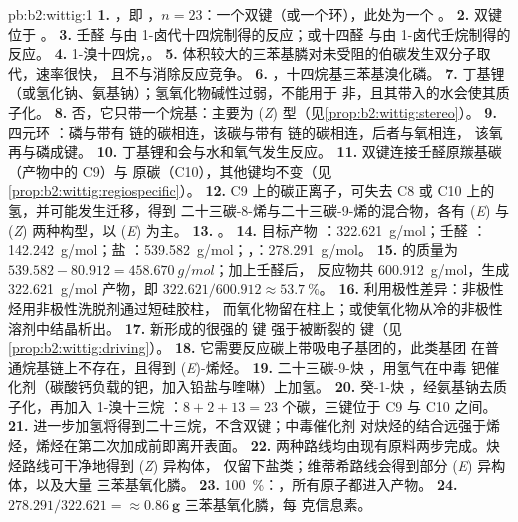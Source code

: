 \begin{solution}{pb:b2:wittig:1}
\textbf{1.} ，即 ，$n = 23$：一个双键（或一个环），此处为一个
。
\textbf{2.} 双键位于 。
\textbf{3.} 壬醛  与由 1-卤代十四烷制得的反应；或十四醛
 与由 1-卤代壬烷制得的反应。
\textbf{4.} 1-溴十四烷，。
\textbf{5.} 体积较大的三苯基膦对未受阻的伯碳发生双分子取代，速率很快，
且不与消除反应竞争。
\textbf{6.} ，十四烷基三苯基溴化磷。
\textbf{7.} 丁基锂（或氢化钠、氨基钠）；氢氧化物碱性过弱，不能用于
非，且其带入的水会使其质子化。
\textbf{8.} 否，它只带一个烷基：主要为 (\textit{Z}) 型（见\cref{prop:b2:wittig:stereo}）。
\textbf{9.} 四元环 ：磷与带有
 链的碳相连，该碳与带有  链的碳相连，后者与氧相连，
该氧再与磷成键。
\textbf{10.} 丁基锂和会与水和氧气发生反应。
\textbf{11.} 双键连接壬醛原羰基碳（产物中的 C9）与
原碳（C10），其他键均不变（见\cref{prop:b2:wittig:regiospecific}）。
\textbf{12.} C9 上的碳正离子，可失去 C8 或 C10 上的氢，并可能发生迁移，得到
二十三碳-8-烯与二十三碳-9-烯的混合物，各有 (\textit{E}) 与 (\textit{Z}) 两种构型，以 (\textit{E}) 为主。
\textbf{13.} 。
\textbf{14.} 目标产物 ：\qty{322.621}{g/mol}；壬醛 ：\qty{142.242}{g/mol}；盐
：\qty{539.582}{g/mol}；，：\qty{278.291}{g/mol}。
\textbf{15.}   的质量为 $539.582 - 80.912 = \qty{458.670}{g/mol}$；加上壬醛后，
反应物共 \qty{600.912}{g/mol}，生成 \qty{322.621}{g/mol} 产物，即 $322.621/600.912 \approx
53.7~\%$。
\textbf{16.} 利用极性差异：非极性烃用非极性洗脱剂通过短硅胶柱，
而氧化物留在柱上；或使氧化物从冷的非极性溶剂中结晶析出。
\textbf{17.} 新形成的很强的  键
强于被断裂的  键（见\cref{prop:b2:wittig:driving}）。
\textbf{18.} 它需要反应碳上带吸电子基团的，此类基团
在普通烷基链上不存在，且得到 (\textit{E})-烯烃。
\textbf{19.} 二十三碳-9-炔 ，用氢气在中毒
钯催化剂（碳酸钙负载的钯，加入铅盐与喹啉）上加氢。
\textbf{20.} 癸-1-炔 ，经氨基钠去质子化，再加入 1-溴十三烷
：$8 + 2 + 13 = 23$ 个碳，三键位于 C9 与 C10 之间。
\textbf{21.} 进一步加氢将得到二十三烷，不含双键；中毒催化剂
对炔烃的结合远强于烯烃，烯烃在第二次加成前即离开表面。
\textbf{22.} 两种路线均由现有原料两步完成。炔烃路线可干净地得到 (\textit{Z}) 异构体，
仅留下盐类；维蒂希路线会得到部分 (\textit{E}) 异构体，以及大量
三苯基氧化膦。
\textbf{23.} 100~\%：，所有原子都进入产物。
\textbf{24.} $278.291/322.621 = \boldsymbol{\approx \qty{0.86}{g}}$ 三苯基氧化膦，每
克信息素。
\end{solution}
